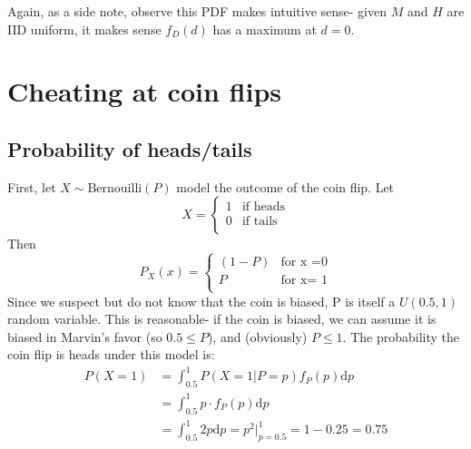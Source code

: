 \documentclass[paper=a4, fontsize=11pt]{scrartcl} %
\numberwithin{equation}{section} %
\numberwithin{figure}{section} %
\numberwithin{table}{section} %
\begin{document}
\begin{center}
\end{center}

Again, as a side note, observe this PDF makes intuitive sense- given $M$ and $H$ are IID uniform, it makes sense $f_D(d)$ has a maximum at $d=0$.

\section{Cheating at coin flips}

\subsection{Probability of heads/tails}

First, let $X \sim \textrm{Bernouilli}(P)$ model the outcome of the coin flip. Let
\[
X = 
\begin{cases}
		1 & \textrm{if heads} \\
		0 & \textrm{if tails}\\
\end{cases}
\]
Then
\[
P_X(x) = 
\begin{cases}
		(1-P) & \textrm{for x =0} \\
		P & \textrm{for x= 1}\\
\end{cases}
\]
Since we suspect but do not know that the coin is biased, P is itself a $U(0.5,1)$ random variable. This is reasonable- if the coin is biased, we can assume it is biased in Marvin's favor (so $0.5 \leq P$), and (obviously)  $P \leq 1$. The probability the coin flip is heads under this model is:
\begin{align*}
P(X = 1) &= \int_{0.5}^1 P(X = 1 | P = p) f_P(p) \textrm{d}p\\
   &= \int_{0.5}^1 p \cdot f_P(p) \textrm{d}p \\
   &= \int_{0.5}^1 2p  \textrm{d}p = p^2\Big|_{p = 0.5}^1 = 1 - 0.25 = 0.75
\end{align*}
\end{document}
